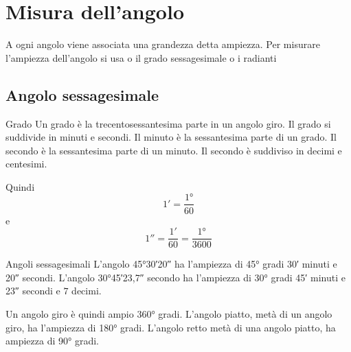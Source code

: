 \section{Misura dell'angolo}
\label{sec:MisuraAngoloGonio}

A ogni angolo viene associata una grandezza detta ampiezza.  Per misurare l'ampiezza dell'angolo si usa o il grado sessagesimale  o i radianti
\subsection{Angolo sessagesimale}
\begin{definizionet}{Grado}{}
Un grado è la trecentosessantesima parte in un angolo giro. Il grado si suddivide in minuti e  secondi. Il minuto è la sessantesima parte di un grado. Il secondo è la sessantesima parte di un minuto. Il secondo è suddiviso in decimi e centesimi.
\end{definizionet}
 Quindi \[\ang{;1;}=\dfrac{\ang{1}}{60}\] e  \[\ang{;;1}=\dfrac{\ang{;1;}}{60}=\dfrac{\ang{1}}{3600}\]
\begin{esempiot}{Angoli sessagesimali}{}
L'angolo  \ang{45;30;20}  ha l'ampiezza di \ang{45} gradi \ang{;30;} minuti e \ang{;;20} secondi. L'angolo \ang{30;45;23,7} secondo ha l'ampiezza di \ang{30} gradi \ang{;45;} minuti e \ang{;;23} secondi e $7$ decimi.
\end{esempiot}
Un angolo giro è quindi ampio \ang{360} gradi. L'angolo piatto,  metà di un angolo giro, ha l'ampiezza di \ang{180} gradi. L'angolo retto  metà di una angolo piatto, ha ampiezza di \ang{90} gradi.

